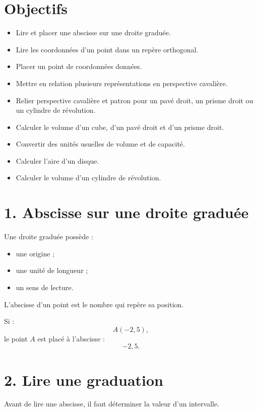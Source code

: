 
\section{Objectifs}

\begin{itemize}
\item Lire et placer une abscisse sur une droite graduée.
\item Lire les coordonnées d'un point dans un repère orthogonal.
\item Placer un point de coordonnées données.
\item Mettre en relation plusieurs représentations en perspective cavalière.
\item Relier perspective cavalière et patron pour un pavé droit, un prisme droit ou un cylindre de révolution.
\item Calculer le volume d'un cube, d'un pavé droit et d'un prisme droit.
\item Convertir des unités usuelles de volume et de capacité.
\item Calculer l'aire d'un disque.
\item Calculer le volume d'un cylindre de révolution.
\end{itemize}

\section{1. Abscisse sur une droite graduée}

Une droite graduée possède :
\begin{itemize}
\item une origine ;
\item une unité de longueur ;
\item un sens de lecture.
\end{itemize}

L'abscisse d'un point est le nombre qui repère sa position.

Si :
\[
A(-2{,}5),
\]
le point $A$ est placé à l'abscisse :
\[
-2{,}5.
\]

\section{2. Lire une graduation}

Avant de lire une abscisse, il faut déterminer la valeur d'un intervalle.

